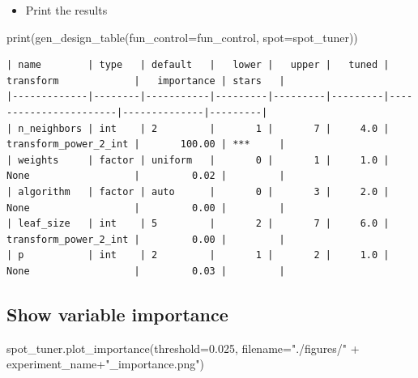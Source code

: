 \documentclass[
  letterpaper,
  DIV=11,
  numbers=noendperiod]{scrreprt}
\newenvironment{Shaded}{\begin{snugshade}}{\end{snugshade}}
\newcommand{\BuiltInTok}[1]{\textcolor[rgb]{0.00,0.23,0.31}{#1}}
\newcommand{\FloatTok}[1]{\textcolor[rgb]{0.68,0.00,0.00}{#1}}
\newcommand{\NormalTok}[1]{\textcolor[rgb]{0.00,0.23,0.31}{#1}}
\newcommand{\OperatorTok}[1]{\textcolor[rgb]{0.37,0.37,0.37}{#1}}
\newcommand{\StringTok}[1]{\textcolor[rgb]{0.13,0.47,0.30}{#1}}
\providecommand{\tightlist}{%
  \setlength{\itemsep}{0pt}\setlength{\parskip}{0pt}}\usepackage{longtable,booktabs,array}
\begin{document}
\begin{itemize}
\tightlist
\item
  Print the results
\end{itemize}

\begin{Shaded}
\begin{Highlighting}[]
\BuiltInTok{print}\NormalTok{(gen\_design\_table(fun\_control}\OperatorTok{=}\NormalTok{fun\_control,}
\NormalTok{    spot}\OperatorTok{=}\NormalTok{spot\_tuner))}
\end{Highlighting}
\end{Shaded}

\begin{verbatim}
| name        | type   | default   |   lower |   upper |   tuned | transform             |   importance | stars   |
|-------------|--------|-----------|---------|---------|---------|-----------------------|--------------|---------|
| n_neighbors | int    | 2         |       1 |       7 |     4.0 | transform_power_2_int |       100.00 | ***     |
| weights     | factor | uniform   |       0 |       1 |     1.0 | None                  |         0.02 |         |
| algorithm   | factor | auto      |       0 |       3 |     2.0 | None                  |         0.00 |         |
| leaf_size   | int    | 5         |       2 |       7 |     6.0 | transform_power_2_int |         0.00 |         |
| p           | int    | 2         |       1 |       2 |     1.0 | None                  |         0.03 |         |
\end{verbatim}

\hypertarget{show-variable-importance-4}{%
\subsection{Show variable importance}\label{show-variable-importance-4}}

\begin{Shaded}
\begin{Highlighting}[]
\NormalTok{spot\_tuner.plot\_importance(threshold}\OperatorTok{=}\FloatTok{0.025}\NormalTok{, filename}\OperatorTok{=}\StringTok{"./figures/"} \OperatorTok{+}\NormalTok{ experiment\_name}\OperatorTok{+}\StringTok{"\_importance.png"}\NormalTok{)}
\end{Highlighting}
\end{Shaded}
\end{document}

